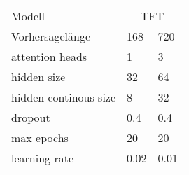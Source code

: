 \begin{tabular}{
    l
    l
    l
}
    \toprule
    {Modell} & \multicolumn{2}{c}{TFT} \\
    \cmidrule(lr){2-3}
    Vorhersagelänge & {168} & {720} \\
    \midrule
    attention heads & 1 & 3 \\
    hidden size & 32 & 64 \\
    hidden continous size & 8 & 32 \\
    dropout & 0.4 & 0.4 \\
    max epochs & 20 & 20 \\
    learning rate & 0.02 & 0.01 \\
\end{tabular}

